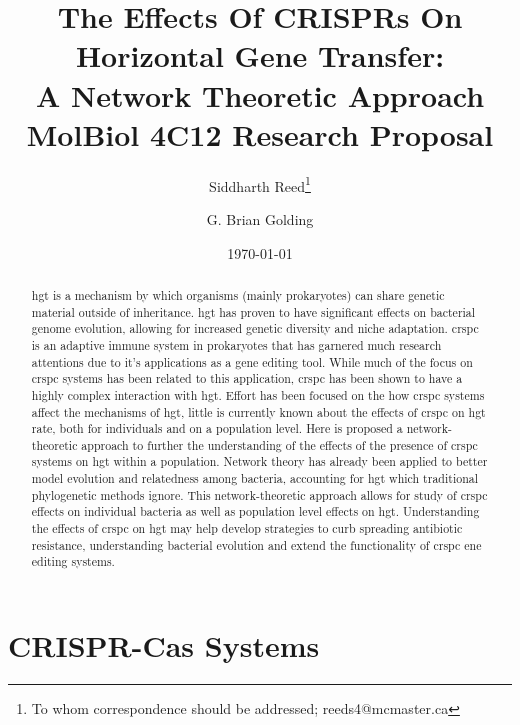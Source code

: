\documentclass[12pt,letter]{article}
\begin{document}
\title{The Effects Of CRISPRs On Horizontal Gene Transfer:\\
        A Network Theoretic Approach\\ \vspace{0.5cm}
       \Large MolBiol 4C12 Research Proposal}
\author[1]{Siddharth Reed\thanks{To whom correspondence should be addressed; reeds4@mcmaster.ca}}
\author[1]{G. Brian Golding}
\date{\today}
\maketitle
\begin{abstract}
    \ac{hgt} is a mechanism by which organisms (mainly prokaryotes) can share genetic material outside of inheritance.
    \ac{hgt} has proven to have significant effects on bacterial genome evolution, allowing for increased genetic diversity and niche adaptation.
    \ac{crspc} is an adaptive immune system in prokaryotes that has garnered much research attentions due to it's applications as a gene editing tool.
    While much of the focus on \ac{crspc} systems has been related to this application, \ac{crspc} has been shown to have a highly complex interaction with \ac{hgt}.
    Effort has been focused on the how \ac{crspc} systems affect the mechanisms of \ac{hgt}, little is currently known about the effects of \ac{crspc} on \ac{hgt} rate, both for individuals and on a population level.
    Here is proposed a network-theoretic approach to further the understanding of the effects of the presence of \ac{crspc} systems on \ac{hgt} within a population.
    Network theory has already been applied to better model evolution and relatedness among bacteria, accounting for \ac{hgt} which traditional phylogenetic methods ignore.
    This network-theoretic approach allows for study of \ac{crspc} effects on individual bacteria as well as population level effects on \ac{hgt}.
    Understanding the effects of \ac{crspc} on \ac{hgt} may help develop strategies to curb spreading antibiotic resistance, understanding bacterial evolution and extend the functionality of \ac{crspc} ene editing systems.
\end{abstract}
\newpage
\linespread{1.25}%
\section{CRISPR-Cas Systems}
\end{document}
